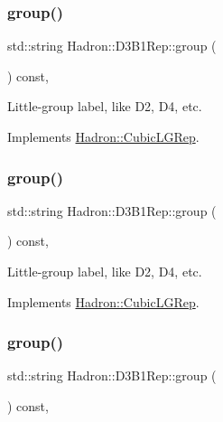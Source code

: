 \subsubsection{\texorpdfstring{group()}{group()}\hspace{0.1cm}{\footnotesize\ttfamily [3/5]}}
{\footnotesize\ttfamily std\+::string Hadron\+::\+D3\+B1\+Rep\+::group (\begin{DoxyParamCaption}{ }\end{DoxyParamCaption}) const\hspace{0.3cm}{\ttfamily [inline]}, {\ttfamily [virtual]}}

Little-\/group label, like D2, D4, etc. 

Implements \mbox{\hyperlink{structHadron_1_1CubicLGRep_a9bdb14b519a611d21379ed96a3a9eb41}{Hadron\+::\+Cubic\+L\+G\+Rep}}.

\mbox{\label{structHadron_1_1D3B1Rep_a2a200d92b086e79b44d9df923fa30fb4}} 
\subsubsection{\texorpdfstring{group()}{group()}\hspace{0.1cm}{\footnotesize\ttfamily [4/5]}}
{\footnotesize\ttfamily std\+::string Hadron\+::\+D3\+B1\+Rep\+::group (\begin{DoxyParamCaption}{ }\end{DoxyParamCaption}) const\hspace{0.3cm}{\ttfamily [inline]}, {\ttfamily [virtual]}}

Little-\/group label, like D2, D4, etc. 

Implements \mbox{\hyperlink{structHadron_1_1CubicLGRep_a9bdb14b519a611d21379ed96a3a9eb41}{Hadron\+::\+Cubic\+L\+G\+Rep}}.

\mbox{\label{structHadron_1_1D3B1Rep_a2a200d92b086e79b44d9df923fa30fb4}} 
\subsubsection{\texorpdfstring{group()}{group()}\hspace{0.1cm}{\footnotesize\ttfamily [5/5]}}
{\footnotesize\ttfamily std\+::string Hadron\+::\+D3\+B1\+Rep\+::group (\begin{DoxyParamCaption}{ }\end{DoxyParamCaption}) const\hspace{0.3cm}{\ttfamily [inline]}, {\ttfamily [virtual]}}

